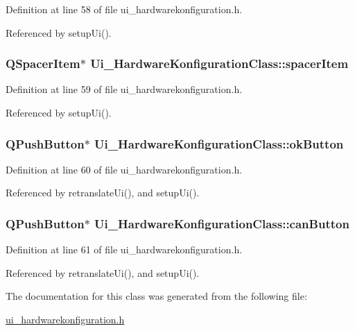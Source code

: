 Definition at line 58 of file ui\_\-hardwarekonfiguration.h.

Referenced by setupUi().\hypertarget{class_ui___hardware_konfiguration_class_b880d2dd22ebd6eb91a4ea2781c9c7c8}{
\subsubsection[spacerItem]{\setlength{\rightskip}{0pt plus 5cm}QSpacerItem$\ast$ {\bf Ui\_\-HardwareKonfigurationClass::spacerItem}}}
\label{class_ui___hardware_konfiguration_class_b880d2dd22ebd6eb91a4ea2781c9c7c8}




Definition at line 59 of file ui\_\-hardwarekonfiguration.h.

Referenced by setupUi().\hypertarget{class_ui___hardware_konfiguration_class_cabb4bbcd486c32f91ece5002edbe4be}{
\subsubsection[okButton]{\setlength{\rightskip}{0pt plus 5cm}QPushButton$\ast$ {\bf Ui\_\-HardwareKonfigurationClass::okButton}}}
\label{class_ui___hardware_konfiguration_class_cabb4bbcd486c32f91ece5002edbe4be}




Definition at line 60 of file ui\_\-hardwarekonfiguration.h.

Referenced by retranslateUi(), and setupUi().\hypertarget{class_ui___hardware_konfiguration_class_9026a8094d9334f126b00375fa27067c}{
\subsubsection[canButton]{\setlength{\rightskip}{0pt plus 5cm}QPushButton$\ast$ {\bf Ui\_\-HardwareKonfigurationClass::canButton}}}
\label{class_ui___hardware_konfiguration_class_9026a8094d9334f126b00375fa27067c}




Definition at line 61 of file ui\_\-hardwarekonfiguration.h.

Referenced by retranslateUi(), and setupUi().

The documentation for this class was generated from the following file:\begin{CompactItemize}
\item 
\hyperlink{ui__hardwarekonfiguration_8h}{ui\_\-hardwarekonfiguration.h}\end{CompactItemize}

